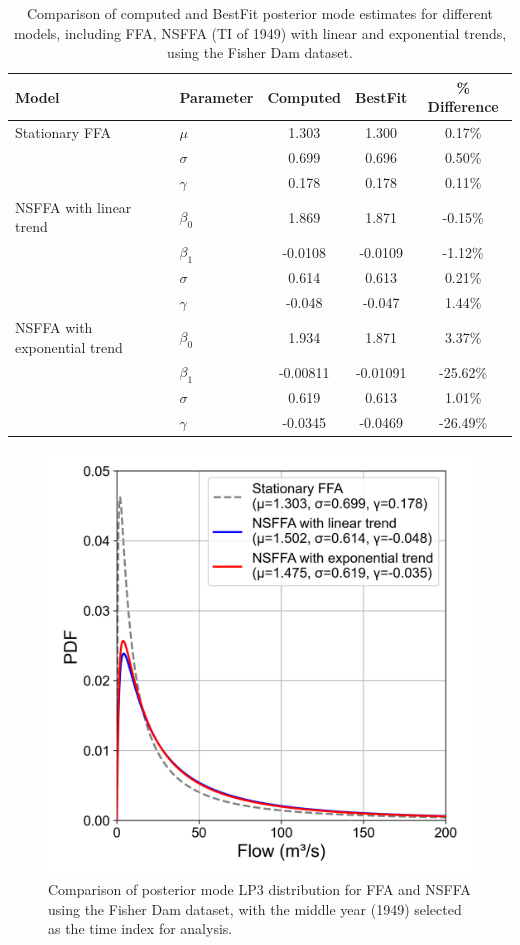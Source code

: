 \renewcommand{\arraystretch}{1.2}
\begin{table}
\centering
\caption{Comparison of computed and BestFit posterior mode estimates for different models, including FFA, NSFFA (TI of 1949) with linear and exponential trends, using the Fisher Dam dataset.}
\begin{tabular}{llccc}
\hline
Model & Parameter & Computed & BestFit & \textbf{\% Difference} \\ \hline
Stationary FFA & $\mu$ & 1.303 & 1.300 & 0.17\% \\
& $\sigma$ & 0.699 & 0.696 & 0.50\% \\
& $\gamma$ & 0.178 & 0.178 & 0.11\% \\ \hline
NSFFA with linear trend & $\beta_0$ & 1.869 & 1.871 & -0.15\% \\
& $\beta_1$ & -0.0108 & -0.0109 & -1.12\% \\
& $\sigma$ & 0.614 & 0.613 & 0.21\% \\
& $\gamma$ & -0.048 & -0.047 & 1.44\% \\ \hline
NSFFA with exponential trend & $\beta_0$ & 1.934 & 1.871 & 3.37\% \\
& $\beta_1$ & -0.00811 & -0.01091 & -25.62\% \\
& $\sigma$ & 0.619 & 0.613 & 1.01\% \\
& $\gamma$ & -0.0345 & -0.0469 & -26.49\% \\ \hline
\end{tabular}
\label{table:OCD_comparison_computed_bestfit}
\end{table}

\begin{figure}[H]
    \centering
    \includegraphics[width=1\linewidth]{_plots/OCD_LP3_nonstationary_comparison.png}
    \caption{Comparison of posterior mode LP3 distribution for FFA and NSFFA using the Fisher Dam dataset, with the middle year (1949) selected as the time index for analysis.}
    \label{fig:OCD_LP3_nonstationary_comparison}
\end{figure}

